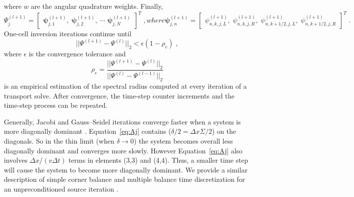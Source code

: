 where $w$ are the angular quadrature weights.
Finally,
\begin{subequations}
\begin{equation}
\Psi^{(l+1)}_j =  \begin{bmatrix}
    \bm{\psi}_{j,1}^{(l+1)}, \;
    \bm{\psi}_{j,2}^{(l+1)}, \;
    \cdots \;
    \bm{\psi}_{j,N}^{(l+1)}
    \end{bmatrix} ^{T} \; ,
\end{equation}
where
\begin{equation} 
\bm{\psi}_{j,n}^{(l+1)} = \begin{bmatrix}
    \psi_{n,k,j,L}^{(l+1)}, \;
    \psi_{n,k,j,R}^{(l+1)}, \;
    \psi_{n,k+1/2,j,L}^{(l+1)}, \;
    \psi_{n,k+1/2,j,R}^{(l+1)}
    \end{bmatrix}^{T} \;.
\end{equation}
\end{subequations}
One-cell inversion iterations continue until
\begin{equation}
    ||\Psi^{(l+1)}-\Psi^{(l)}||_{2} < \epsilon(1-\rho_e) \; ,
\end{equation}
where $\epsilon$ is the convergence tolerance and
\begin{equation}
    \rho_e = \frac{||\Psi^{(l+1)}-\Psi^{(l)}||_{2}}{||\Psi^{(l)}-\Psi^{(l-1)}||_{2}}
\end{equation}
is an empirical estimation of the spectral radius computed at every iteration of a transport solve.
After convergence, the time-step counter increments and the time-step process can be repeated.

Generally, Jacobi and Gauss--Seidel iterations converge faster when a system is more diagonally dominant \cite{isaacson_numerical_1966, golub_matrix_1983}.
Equation~\eqref{eq:Aj} contains ($ \delta/2 = \Delta x\Sigma/2 $) on the diagonals.
So in the thin limit (when $\delta\rightarrow 0$) the system becomes overall less diagonally dominant and converges more slowly.
However Equation~\eqref{eq:Aj} also involves $\Delta x/(v\Delta t)$ terms in elements (3,3) and (4,4).
Thus, a smaller time step will cause the system to become more diagonally dominant.
We provide a similar description of simple corner balance and multiple balance time discretization for an unpreconditioned source iteration \cite{morgan2023oci}.
